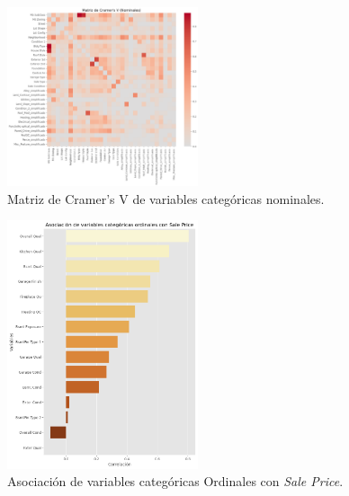 \begin{figure}[ht]
	\begin{center}
	\includegraphics[width=0.5\textwidth]{figures/Matriz Cramer.png}
	\caption[Matriz de Cramer’s V de variables categóricas nominales]{Matriz de Cramer’s V de variables categóricas nominales.}
	\label{fig:cramerV nominales}
	\end{center}
\end{figure}
\clearpage
\begin{figure}[H]
	\begin{center}
	\includegraphics[width=0.5\textwidth]{figures/Asociación de variables categóricas ordinales con Sale Price.png}
	\caption[Asociación de variables categóricas Ordinales con \textit{Sale Price}.]{Asociación de variables categóricas Ordinales con \textit{Sale Price}.}
	\label{fig:precio con categorica ordinal}
	\end{center}
\end{figure}

